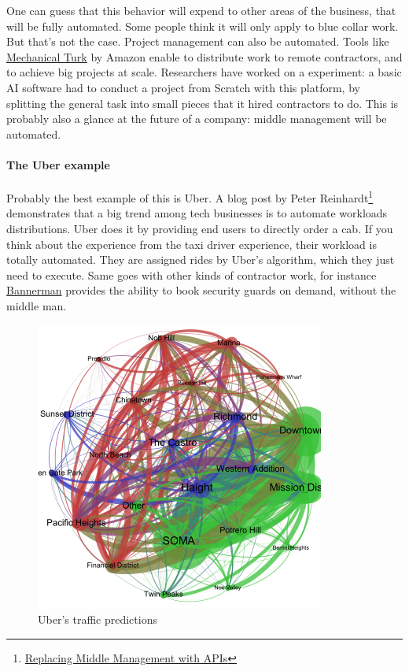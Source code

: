 \documentclass[12pt]{article}
\begin{document}
\smallskip

One can guess that this behavior will expend to other areas of the business,
that will be fully automated. Some people think it will only apply to blue
collar work. But that's not the case. Project management can also be automated.
Tools like \href{https://www.mturk.com/mturk/welcome}{Mechanical Turk} by Amazon
enable to distribute work to remote contractors, and to achieve big projects at
scale. Researchers have worked on a experiment: a basic AI software had to
conduct a project from Scratch with this platform, by splitting the general
task into small pieces that it hired contractors to do. This is probably also a
glance at the future of a company: middle management will be automated.


\paragraph{The Uber example}

Probably the best example of this is Uber. A blog post by Peter
Reinhardt\footnote{\href{http://rein.pk/replacing-middle-management-with-apis/}
{Replacing Middle Management with APIs}} demonstrates that a big trend among
tech businesses is to automate workloads distributions. Uber does it by
providing end users to directly order a cab. If you think about the experience
from the taxi driver experience, their workload is totally automated. They are
assigned rides by Uber's algorithm, which they just need to execute. Same goes
with other kinds of contractor work, for instance
\href{https://www.getbannerman.com/}{Bannerman} provides the ability to book
security guards on demand, without the middle man.


\begin{figure}[ht]
    \centering
    \includegraphics[scale=0.8]{uber-graph}
    \caption{Uber's traffic predictions}
    \label{fig:uber-graph}
\end{figure}
\end{document}
